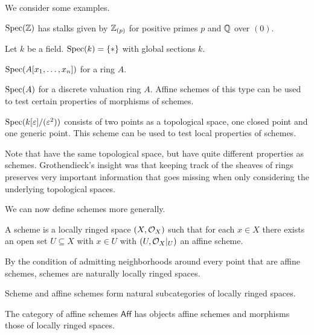 We consider some examples. 
\begin{example}
    $\operatorname{Spec}(\mathbb{Z})$ has stalks given by $\mathbb{Z}_{(p)}$ for positive primes $p$ and $\mathbb{Q}$ over $(0)$. 
\end{example}
\begin{example}
    Let $k$ be a field. $\operatorname{Spec}(k)=\{*\}$ with global sections $k$. 
\end{example}
\begin{example}
    $\operatorname{Spec}(A[x_{1},\dots,x_{n}])$ for a ring $A$. 
\end{example}
\begin{example}\label{ex: affine scheme over DVR}
    $\operatorname{Spec}(A)$ for a discrete valuation ring $A$. Affine schemes of this type can be used to test certain properties of morphisms of schemes. 
\end{example}
\begin{example}\label{ex: dual numbers}
    $\operatorname{Spec}(k[\varepsilon]/(\varepsilon^{2}))$ consists of two points as a topological space, one closed point and one generic point. This scheme can be used to test local properties of schemes. 
\end{example}
\begin{remark}
    Note that  have the same topological space, but have quite different properties as schemes. Grothendieck's insight was that keeping track of the sheaves of rings preserves very important information that goes missing when only considering the underlying topological spaces. 
\end{remark}
We can now define schemes more generally. 
\begin{definition}[Scheme]\label{def: scheme}
    A scheme is a locally ringed space $(X,\mathcal{O}_{X})$ such that for each $x\in X$ there exists an open set $U\subseteq X$ with $x\in U$ with $(U,\mathcal{O}_{X}|_{U})$ an affine scheme. 
\end{definition}
\begin{remark}
    By the condition of admitting neighborhoods around every point that are affine schemes, schemes are naturally locally ringed spaces. 
\end{remark}
Scheme and affine schemes form natural subcategories of locally ringed spaces. 
\begin{definition}\label{def: category of affine schemes}
    The category of affine schemes $\mathsf{Aff}$ has objects affine schemes and morphisms those of locally ringed spaces. 
\end{definition}
